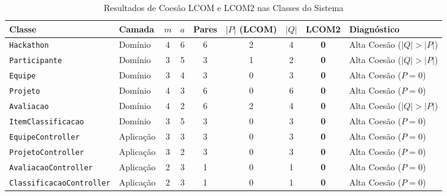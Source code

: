 \documentclass[12pt]{article}
\begin{document}
\begin{table}[H]
\centering
\scriptsize
\setlength{\tabcolsep}{3.5pt}
\begin{tabular}{|l|l|c|c|c|c|c|c|l|}
\hline
\textbf{Classe} & \textbf{Camada} & $m$ & $a$ & \textbf{Pares} & $|P|$ (\textbf{LCOM}) & $|Q|$ & \textbf{LCOM2} & \textbf{Diagnóstico} \\ \hline
\texttt{Hackathon} & Domínio & 4 & 6 & 6 & 2 & 4 & \textbf{0} & Alta Coesão ($|Q| > |P|$) \\ \hline
\texttt{Participante} & Domínio & 3 & 5 & 3 & 1 & 2 & \textbf{0} & Alta Coesão ($|Q| > |P|$) \\ \hline
\texttt{Equipe} & Domínio & 3 & 4 & 3 & 0 & 3 & \textbf{0} & Alta Coesão ($P = 0$) \\ \hline
\texttt{Projeto} & Domínio & 4 & 3 & 6 & 0 & 6 & \textbf{0} & Alta Coesão ($P = 0$) \\ \hline
\texttt{Avaliacao} & Domínio & 4 & 2 & 6 & 2 & 4 & \textbf{0} & Alta Coesão ($|Q| > |P|$) \\ \hline
\texttt{ItemClassificacao} & Domínio & 3 & 5 & 3 & 0 & 3 & \textbf{0} & Alta Coesão ($P = 0$) \\ \hline
\texttt{EquipeController} & Aplicação & 3 & 3 & 3 & 0 & 3 & \textbf{0} & Alta Coesão ($P = 0$) \\ \hline
\texttt{ProjetoController} & Aplicação & 3 & 2 & 3 & 0 & 3 & \textbf{0} & Alta Coesão ($P = 0$) \\ \hline
\texttt{AvaliacaoController} & Aplicação & 2 & 3 & 1 & 0 & 1 & \textbf{0} & Alta Coesão ($P = 0$) \\ \hline
\texttt{ClassificacaoController} & Aplicação & 2 & 3 & 1 & 0 & 1 & \textbf{0} & Alta Coesão ($P = 0$) \\ \hline
\end{tabular}
\caption{Resultados de Coesão LCOM e LCOM2 nas Classes do Sistema}
\label{tab:lcom}
\end{table}
\end{document}
